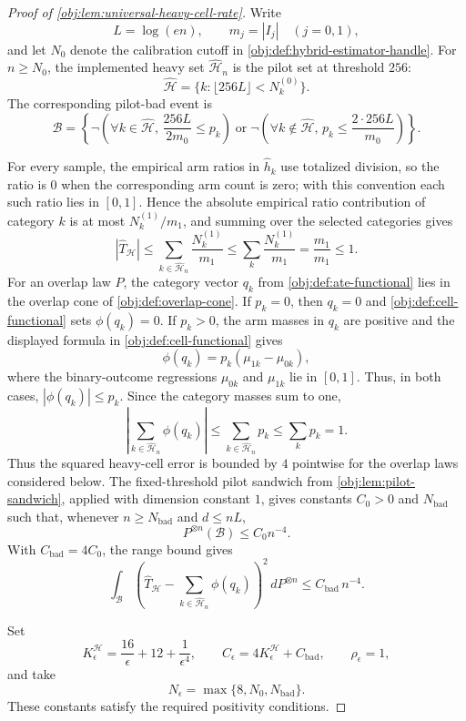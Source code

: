 \documentclass[11pt]{article}
\begin{document}
\begin{proof}[Proof of \cref{obj:lem:universal-heavy-cell-rate}]
Write
\[
L=\log(en),\qquad m_j=|I_j|\quad (j=0,1),
\]
and let \(N_0\) denote the calibration cutoff in \cref{obj:def:hybrid-estimator-handle}. For
\(n\ge N_0\), the implemented heavy set \(\widehat{\mathcal H}_n\) is the pilot set at
threshold \(256\):
\[
\widehat{\mathcal H}
=
\{k:\lfloor 256L\rfloor<N_k^{(0)}\}.
\]
The corresponding pilot-bad event is
\[
\mathcal B
=
\left\{
\neg\left(\forall k\in\widehat{\mathcal H},\,\frac{256L}{2m_0}\le p_k\right)
\mathrel{\text{or}}
\neg\left(\forall k\notin\widehat{\mathcal H},\,p_k\le \frac{2\cdot256L}{m_0}\right)
\right\}.
\]

For every sample, the empirical arm ratios in \(\widehat h_k\) use totalized division, so the
ratio is \(0\) when the corresponding arm count is zero; with this convention each such ratio
lies in \([0,1]\). Hence the absolute empirical ratio contribution of category \(k\) is at most
\(N_k^{(1)}/m_1\), and summing over the selected categories gives
\[
|\widehat T_{\mathcal H}|
\le
\sum_{k\in\widehat{\mathcal H}_n}\frac{N_k^{(1)}}{m_1}
\le
\sum_k\frac{N_k^{(1)}}{m_1}
=
\frac{m_1}{m_1}
\le1.
\]
For an overlap law \(P\), the category vector \(q_k\) from \cref{obj:def:ate-functional}
lies in the overlap cone of \cref{obj:def:overlap-cone}. If \(p_k=0\), then \(q_k=0\) and
\cref{obj:def:cell-functional} sets \(\phi(q_k)=0\). If \(p_k>0\), the arm masses in
\(q_k\) are positive and the displayed formula in \cref{obj:def:cell-functional} gives
\[
\phi(q_k)=p_k(\mu_{1k}-\mu_{0k}),
\]
where the binary-outcome regressions \(\mu_{0k}\) and \(\mu_{1k}\) lie in \([0,1]\). Thus, in
both cases, \(|\phi(q_k)|\le p_k\). Since the category masses sum to one,
\[
\left|\sum_{k\in\widehat{\mathcal H}_n}\phi(q_k)\right|
\le
\sum_{k\in\widehat{\mathcal H}_n}p_k
\le
\sum_k p_k
=1.
\]
Thus the squared heavy-cell error is bounded by \(4\) pointwise for the overlap laws considered
below. The fixed-threshold pilot sandwich from \cref{obj:lem:pilot-sandwich}, applied with
dimension constant \(1\), gives constants \(C_0>0\) and \(N_{\mathrm{bad}}\) such that, whenever
\(n\ge N_{\mathrm{bad}}\) and \(d\le nL\),
\[
P^{\otimes n}(\mathcal B)\le C_0 n^{-4}.
\]
With \(C_{\mathrm{bad}}=4C_0\), the range bound gives
\[
\int_{\mathcal B}
\left(
\widehat T_{\mathcal H}
-
\sum_{k\in\widehat{\mathcal H}_n}\phi(q_k)
\right)^2
\,dP^{\otimes n}
\le C_{\mathrm{bad}}\,n^{-4}.
\] %

Set
\[
K^{\mathcal H}_\epsilon=\frac{16}{\epsilon}+12+\frac1{\epsilon^4},
\qquad
C_\epsilon=4K^{\mathcal H}_\epsilon+C_{\mathrm{bad}},
\qquad
\rho_\epsilon=1,
\]
and take
\[
N_\epsilon=\max\{8,N_0,N_{\mathrm{bad}}\}.
\] %
These constants satisfy the required positivity conditions.


\end{proof}
\end{document}
